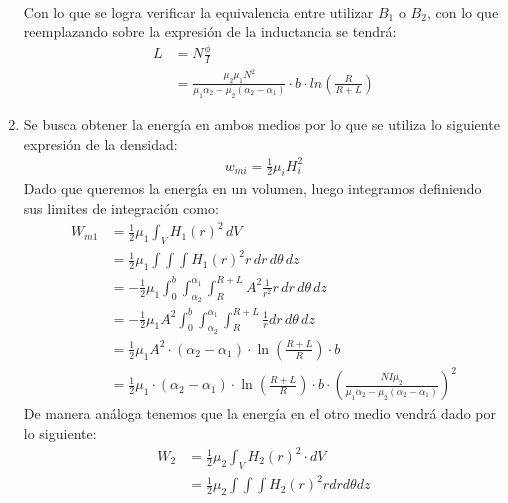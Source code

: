 \documentclass[
  11pt,
  letterpaper,
   addpoints,
   answers
  ]{exam}
\begin{document}
\begin{questions}
\begin{solution}
\begin{enumerate}
\begin{align}
\end{align}
Con lo que se logra verificar la equivalencia entre utilizar $B_{1}$ o $B_{2}$, con lo que reemplazando sobre la expresión de la inductancia se tendrá:
\begin{align}
    L &= N \frac{\phi}{I}\\
      &= \frac{ \mu_{2} \mu_{1} N^{2}}{\mu_{1}\alpha_{2} - \mu_{2}(\alpha_{2} - \alpha_{1})}   \cdot b \cdot ln\left(\frac{R}{R+L}\right)
\end{align}
        \item Se busca obtener la energía en ambos medios por lo que se utiliza lo siguiente expresión de la densidad:
        \begin{align}
            w_{mi}= \frac{1}{2}\mu_{i} H_{i}^{2}
        \end{align}
        Dado que queremos la energía en un volumen, luego integramos definiendo sus limites de integración como:\\
        {\small
        \begin{align}
            W_{m1} &= \frac{1}{2}\mu_{1} \int_{V} H_{1}(r)^{2} \, dV\\
                  &= \frac{1}{2}\mu_{1} \int \int \int  H_{1}(r)^{2}  r \, dr \, d\theta \, dz\\
                  &=- \frac{1}{2}\mu_{1} \int_{0}^{b}\int_{\alpha_{2}}^{\alpha_{1}} \int_{R}^{R+L} A^{2} \frac{1}{r^{2}} r \, dr \, d\theta \, dz\\
                  &= -\frac{1}{2}\mu_{1} A^{2} \int_{0}^{b}\int_{\alpha_{2}}^{\alpha_{1}} \int_{R}^{R+L} \frac{1}{r} dr \, d\theta \, dz\\
                  &= \frac{1}{2}\mu_{1} A^{2}  \cdot  (\alpha_{2} - \alpha_{1}) \cdot \ln\left(\frac{R+L}{R}\right) \cdot b\\
                  &= \frac{1}{2}\mu_{1} \cdot  (\alpha_{2} - \alpha_{1}) \cdot \ln\left(\frac{R+L}{R}\right) \cdot b \cdot \left(\frac{NI \mu_{2}}{\mu_{1}\alpha_{2} - \mu_{2} (\alpha_{2} - \alpha_{1})}\right)^{2}
        \end{align}
        }
        De manera análoga tenemos que la energía en el otro medio vendrá dado por lo siguiente:\\
        {\small
        \begin{align}
            W_{2} &= \frac{1}{2}\mu_{2} \int_{V} H_{2}(r)^{2} \cdot dV\\
                  &= \frac{1}{2}\mu_{2} \int \int \int  H_{2}(r)^{2}  r dr d\theta dz\\

\end{align}}
\end{enumerate}
\end{solution}
\end{questions}
\end{document}
